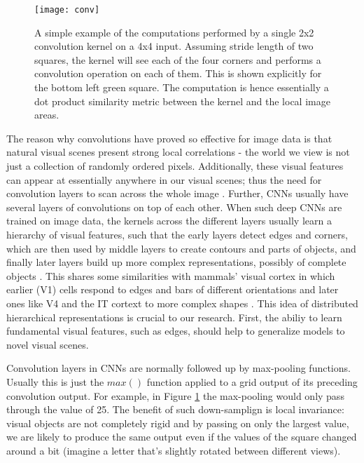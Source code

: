 \documentclass{report}
\begin{document}
\begin{figure}
  \centering
	\texttt{[image: conv]}
	\caption{A simple example of the computations performed by a single 2x2 convolution kernel on a 4x4 input. Assuming stride length of two squares, the kernel will see each of the four corners and performs a convolution operation on each of them. This is shown explicitly for the bottom left green square. The computation is hence essentially a dot product similarity metric between the kernel and the local image areas.}
	\label{fig:conv}
\end{figure}

The reason why convolutions have proved so effective for image data is that natural visual scenes present strong local correlations - the world we view is not just a collection of randomly ordered pixels. Additionally, these visual features can appear at essentially anywhere in our visual scenes; thus the need for convolution layers to scan across the whole image \cite{Lecun2015}. Further, CNNs usually have several layers of convolutions on top of each other. When such deep CNNs are trained on image data, the kernels across the different layers usually learn a hierarchy of visual features, such that the early layers detect edges and corners, which are then used by middle layers to create contours and parts of objects, and finally later layers build up more complex representations, possibly of complete objects \cite{Zeiler2014}. This shares some similarities with mammals' visual cortex in which earlier (V1) cells respond to edges and bars of different orientations \cite{Hubeld1962} and later ones like V4 and the IT cortext to more complex shapes \cite{Kobatake1994}. This idea of distributed hierarchical representations is crucial to our research. First, the abiliy to learn fundamental visual features, such as edges, should help to generalize models to novel visual scenes. 

Convolution layers in CNNs are normally followed up by max-pooling functions. Usually this is just the $max()$ function applied to a grid output of its preceding convolution output. For example, in Figure \ref{fig:conv} the max-pooling would only pass through the value of 25. The benefit of such down-samplign is local invariance: visual objects are not completely rigid and by passing on only the largest value, we are likely to produce the same output even if the values of the square changed around a bit \cite{Lecun2015} (imagine a letter that's slightly rotated between different views).
\end{document}
